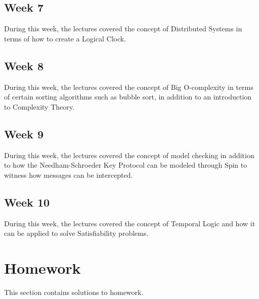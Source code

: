 \documentclass{article}
\theoremstyle{theorem}
\theoremstyle{definition}
\theoremstyle{remark}
\begin{document}
\subsection{Week 7} During this week, the lectures covered the concept of Distributed Systems in terms of how to create a Logical Clock.
\subsection{Week 8} During this week, the lectures covered the concept of Big O-complexity in terms of certain sorting algorithms such as bubble sort, in addition to an introduction to Complexity Theory.
\subsection{Week 9} During this week, the lectures covered the concept of model checking in addition to how the Needham-Schroeder Key Protocol can be modeled through Spin to witness how messages can be intercepted.
\subsection{Week 10} During this week, the lectures covered the concept of Temporal Logic and how it can be applied to solve Satisfiability problems.
\section{Homework}\label{homework}

This section contains solutions to homework. 
\end{document}
